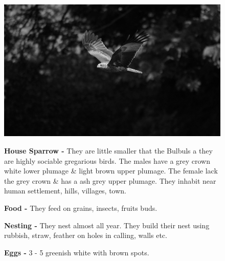 \begin{figure}[H]
\begin{center}
\includegraphics{figure/Land_birds/01_pariah_kite/pariah-kite.eps}
\end{center}
\medskip
\noindent
{\bf House Sparrow -} They are little smaller that the Bulbuls a they are highly sociable gregarious birds. The males have a grey crown white lower plumage \& light brown upper plumage. The female lack the grey crown \& has a ash grey upper plumage. They inhabit near human settlement, hills, villages, town. 

\medskip
{\bf Food -} They feed on grains, insects, fruits buds.

{\bf Nesting -} They nest almost all year. They build their nest using rubbish, straw, feather on holes in calling, walls etc.

{\bf Eggs -} 3 - 5 greenish white with brown spots.
\end{figure}

\vfill\eject

~\phantom{a}
\vfill

